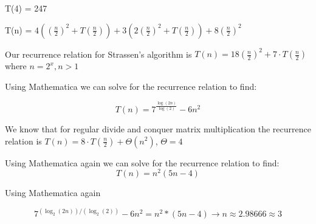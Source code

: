 \documentclass[12pt]{article}
\begin{document}
\noindent T(4) =  247
\medskip

\noindent T(n) = $4((\frac{n}{2})^2 + T(\frac{n}{2})) + 3(2(\frac{n}{2})^2 + T(\frac{n}{2})) + 8(\frac{n}{2})^2$
\bigskip

\noindent Our recurrence relation for Strassen's algorithm is $T(n) = 18(\frac{n}{2})^2 + 7\cdot T(\frac{n}{2})$ where $n=2^x, n >1$
\bigskip

\noindent Using Mathematica we can solve for the recurrence relation to find:

$$T(n) = 7^{\frac{\log(2n)}{\log(2)}} - 6n^2$$

\noindent We know that for regular divide and conquer matrix multiplication the recurrence relation is $T(n) = 8\cdot T(\frac{n}{2}) + \Theta(n^2)$,  $\Theta= 4$
\medskip


\noindent Using Mathematica again we can solve for the recurrence relation to find:
$$T(n) = n^2(5n-4)$$

\noindent Using Mathematica again

$$7^{(\log_2(2 n))/(\log_2(2))}-6 n^2 = n^2*(5n - 4) \to n \approx 2.98666 \approx 3$$
\end{document}

